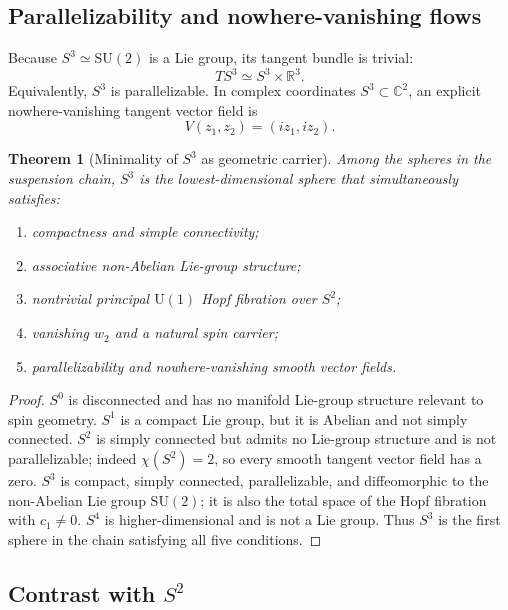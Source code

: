 \documentclass[11pt,a4paper]{article}
\newtheorem{theorem}{Theorem}[section]
\theoremstyle{definition}
\theoremstyle{remark}
\newcommand{\Szero}{S^{0}}
\newcommand{\Sone}{S^{1}}
\newcommand{\Stwo}{S^{2}}
\newcommand{\Sthree}{S^{3}}
\newcommand{\Sfour}{S^{4}}
\newcommand{\R}{\mathbb{R}}
\newcommand{\C}{\mathbb{C}}
\newcommand{\SU}{\mathrm{SU}}
\newcommand{\U}{\mathrm{U}}
\begin{document}
\subsection{Parallelizability and nowhere-vanishing flows}

Because $\Sthree\simeq\SU(2)$ is a Lie group, its tangent bundle is trivial:
\begin{equation}
T\Sthree\simeq \Sthree\times\R^{3}.
\end{equation}
Equivalently, $\Sthree$ is parallelizable.  In complex coordinates $\Sthree\subset\C^{2}$, an
explicit nowhere-vanishing tangent vector field is
\begin{equation}
V(z_{1},z_{2})=(iz_{1},iz_{2}).
\label{eq:hopf-vector-field}
\end{equation}

\begin{theorem}[Minimality of $\Sthree$ as geometric carrier]
Among the spheres in the suspension chain, $\Sthree$ is the lowest-dimensional sphere that
simultaneously satisfies:
\begin{enumerate}[label=(C\arabic*)]
\item compactness and simple connectivity;
\item associative non-Abelian Lie-group structure;
\item nontrivial principal $\U(1)$ Hopf fibration over $\Stwo$;
\item vanishing $w_{2}$ and a natural spin carrier;
\item parallelizability and nowhere-vanishing smooth vector fields.
\end{enumerate}
\end{theorem}

\begin{proof}
$\Szero$ is disconnected and has no manifold Lie-group structure relevant to spin geometry.
$\Sone$ is a compact Lie group, but it is Abelian and not simply connected.  $\Stwo$ is simply
connected but admits no Lie-group structure and is not parallelizable; indeed $\chi(\Stwo)=2$,
so every smooth tangent vector field has a zero.  $\Sthree$ is compact, simply connected,
parallelizable, and diffeomorphic to the non-Abelian Lie group $\SU(2)$; it is also the total
space of the Hopf fibration with $c_{1}\neq0$.  $\Sfour$ is higher-dimensional and is not a Lie
group.  Thus $\Sthree$ is the first sphere in the chain satisfying all five conditions.
\end{proof}

\subsection{Contrast with \texorpdfstring{$\Stwo$}{S2}}
\end{document}
